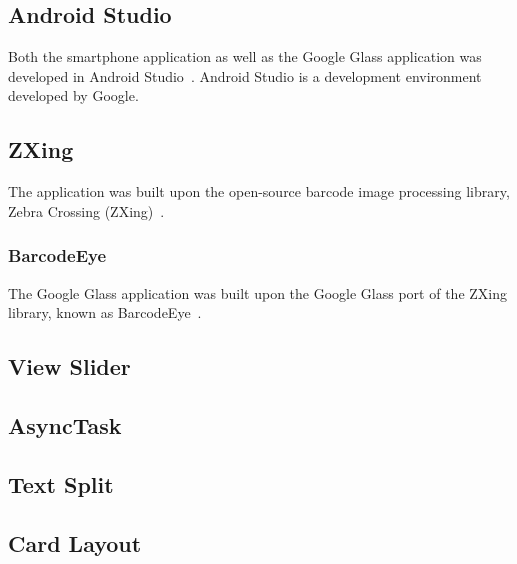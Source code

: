 \subsection{Android Studio}
Both the smartphone application as well as the Google Glass application was developed in Android Studio~\cite{androidStudio}. Android Studio is a development environment developed by Google. %

\subsection{ZXing}
The application was built upon the open-source barcode image processing library, Zebra Crossing (ZXing)~\cite{zxing}. %

\subsubsection{BarcodeEye}
The Google Glass application was built upon the Google Glass port of the ZXing library, known as BarcodeEye~\cite{barcodeEye}.%

\subsection{View Slider}


\subsection{AsyncTask}


\subsection{Text Split}


\subsection{Card Layout}


